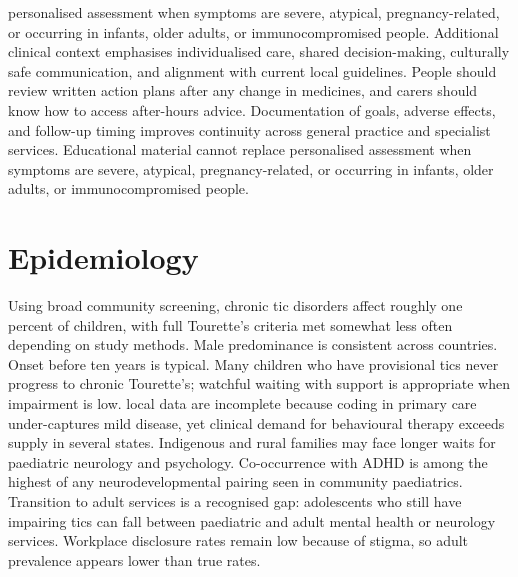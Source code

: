 personalised assessment when symptoms are severe, atypical, pregnancy-related, or occurring in infants, older adults, or immunocompromised people. Additional clinical context emphasises individualised care, shared decision-making, culturally safe communication, and alignment with current local guidelines. People should review written action plans after any change in medicines, and carers should know how to access after-hours advice. Documentation of goals, adverse effects, and follow-up timing improves continuity across general practice and specialist services. Educational material cannot replace personalised assessment when symptoms are severe, atypical, pregnancy-related, or occurring in infants, older adults, or immunocompromised people.

\section*{Epidemiology}
Using broad community screening, chronic tic disorders affect roughly one percent of children, with full Tourette's criteria met somewhat less often depending on study methods. Male predominance is consistent across countries. Onset before ten years is typical. Many children who have provisional tics never progress to chronic Tourette's; watchful waiting with support is appropriate when impairment is low. local data are incomplete because coding in primary care under-captures mild disease, yet clinical demand for behavioural therapy exceeds supply in several states. Indigenous and rural families may face longer waits for paediatric neurology and psychology. Co-occurrence with ADHD is among the highest of any neurodevelopmental pairing seen in community paediatrics. Transition to adult services is a recognised gap: adolescents who still have impairing tics can fall between paediatric and adult mental health or neurology services. Workplace disclosure rates remain low because of stigma, so adult prevalence appears lower than true rates.

